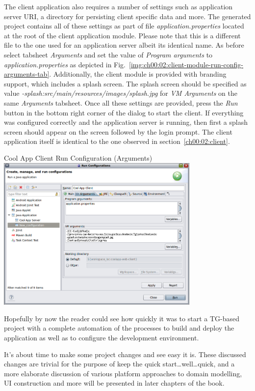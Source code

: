  The client application also requires a number of settings such as application server URI, a directory for persisting client specific data and more.
  The generated project contains all of these settings as part of file \emph{application.properties} located at the root of the client application module.
  Please note that this is a different file to the one used for an application server albeit its identical name.
  As before select tabsheet \emph{Arguments} and set the value of \emph{Program arguments} to \emph{application.properties} as depicted in Fig.~\ref{img:ch00:02:client-module-run-config-arguments-tab}.
  Additionally, the client module is provided with branding support, which includes a splash screen.
  The splash screen should be specified as value \emph{-splash:src/main/resources/images/splash.jpg} for \emph{VM Arguments} on the same \emph{Arguments} tabsheet.
  Once all these settings are provided, press the \emph{Run} button in the bottom right corner of the dialog to start the client.
  If everything was configured correctly and the application server is running, then first a splash screen should appear on the screen followed by the login prompt.
  The client application itself is identical to the one observed in section~\ref{ch00:02:client}.

  \begin{image}{Cool App Client Run Configuration (Arguments)}{\label{img:ch00:02:client-module-run-config-arguments-tab}}    
    \includegraphics[width=0.75\textwidth]{parts/00-part/chapters/01-application-modules/images/16-client-module-run-config-arguments-tab.png}
  \end{image}
  
  Hopefully by now the reader could see how quickly it was to start a TG-based project with a complete automation of the processes to build and deploy the application as well as to configure the development environment.
  
  It's about time to make some project changes and see easy it is.
  These discussed changes are trivial for the purpose of keep the quick start\ldots well\ldots quick, and a more elaborate discussion of various platform approaches to domain modelling, UI construction and more will be presented in later chapters of the book.